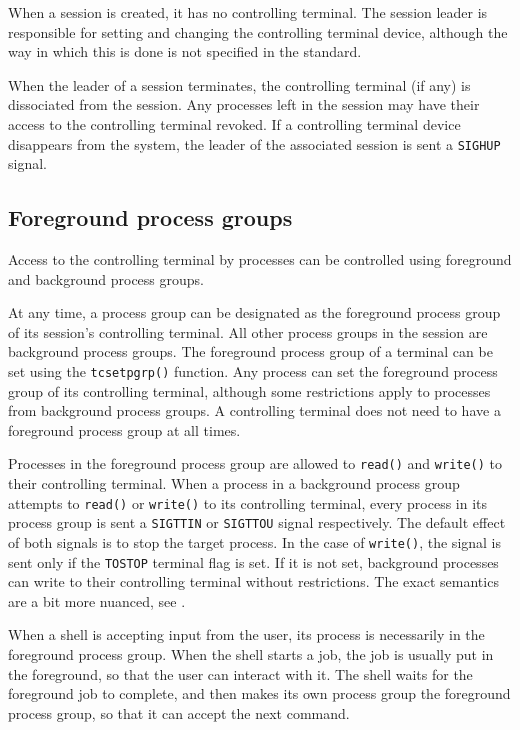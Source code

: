 \documentclass[shortabstract, manyadvisors, english, mgr]{iithesis}
\begin{document}
When a session is created, it has no controlling terminal. The session leader is
responsible for setting and changing the controlling terminal device, although
the way in which this is done is not specified in the standard.

When the leader of a session terminates, the controlling terminal (if any) is
dissociated from the session. Any processes left in the session may have their
access to the controlling terminal revoked. If a controlling terminal device
disappears from the system, the leader of the associated session is sent a
\texttt{SIGHUP} signal.

\subsection{Foreground process groups}
Access to the controlling terminal by processes can be controlled using
foreground and background process groups.

At any time, a process group can be designated as the foreground process group
of its session's controlling terminal. All other process groups in the session
are background process groups. The foreground process group of a terminal can be
set using the \texttt{tcsetpgrp()}\cite{tcsetpgrp} function. Any process can set
the foreground process group of its controlling terminal, although some
restrictions apply to processes from background process groups. A controlling
terminal does not need to have a foreground process group at all times.

Processes in the foreground process group are allowed to \texttt{read()} and
\texttt{write()} to their controlling terminal. When a process in a background
process group attempts to \texttt{read()} or \texttt{write()} to its controlling
terminal, every process in its process group is sent a \texttt{SIGTTIN} or
\texttt{SIGTTOU} signal respectively. The default effect of both signals is to
stop the target process. In the case of \texttt{write()}, the signal is sent
only if the \texttt{TOSTOP} terminal flag is set. If it is not set, background
processes can write to their controlling terminal without restrictions. The
exact semantics are a bit more nuanced, see \cite{terminal-access}.

When a shell is accepting input from the user, its process is necessarily in the
foreground process group. When the shell starts a job, the job is usually put in
the foreground, so that the user can interact with it. The shell waits for the
foreground job to complete, and then makes its own process group the foreground
process group, so that it can accept the next command.
\end{document}
